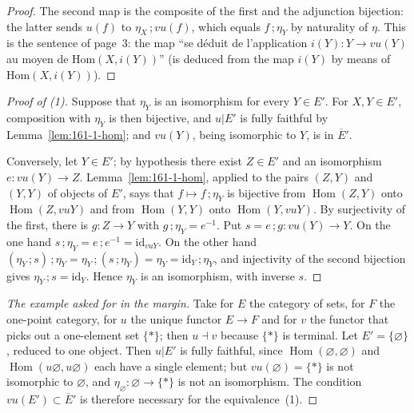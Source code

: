 \documentclass[11pt]{article}
\newcommand{\q}[1]{“#1”}
\theoremstyle{plain}
\theoremstyle{definition}
\theoremstyle{remark}
\begin{document}
\begin{proof}
The second map is the composite of the first and the adjunction bijection: the latter sends $u(f)$ to $\eta_X\,;vu(f)$, which equals $f\,;\eta_Y$ by naturality of $\eta$. This is the sentence of page~3: the map \q{se déduit de l'application $i(Y) : Y \to vu(Y)$ au moyen de $\mathrm{Hom}(X, i(Y))$} (is deduced from the map $i(Y)$ by means of $\mathrm{Hom}(X, i(Y))$).
\end{proof}

\begin{proof}[Proof of (1)]
Suppose that $\eta_Y$ is an isomorphism for every $Y \in E'$. For $X, Y \in E'$, composition with $\eta_Y$ is then bijective, and $u|E'$ is fully faithful by Lemma~\ref{lem:161-1-hom}; and $vu(Y)$, being isomorphic to $Y$, is in $\overline{E}'$.

Conversely, let $Y \in E'$; by hypothesis there exist $Z \in E'$ and an isomorphism $e : vu(Y) \to Z$. Lemma~\ref{lem:161-1-hom}, applied to the pairs $(Z, Y)$ and $(Y, Y)$ of objects of $E'$, says that $f \mapsto f\,;\eta_Y$ is bijective from $\operatorname{Hom}(Z, Y)$ onto $\operatorname{Hom}(Z, vuY)$ and from $\operatorname{Hom}(Y, Y)$ onto $\operatorname{Hom}(Y, vuY)$. By surjectivity of the first, there is $g : Z \to Y$ with $g\,;\eta_Y = e^{-1}$. Put $s = e\,;g : vu(Y) \to Y$. On the one hand $s\,;\eta_Y = e\,;e^{-1} = \mathrm{id}_{vuY}$. On the other hand $(\eta_Y\,;s)\,;\eta_Y = \eta_Y\,;(s\,;\eta_Y) = \eta_Y = \mathrm{id}_Y\,;\eta_Y$, and injectivity of the second bijection gives $\eta_Y\,;s = \mathrm{id}_Y$. Hence $\eta_Y$ is an isomorphism, with inverse $s$.
\end{proof}

\begin{proof}[The example asked for in the margin]
Take for $E$ the category of sets, for $F$ the one-point category, for $u$ the unique functor $E \to F$ and for $v$ the functor that picks out a one-element set $\{*\}$; then $u \dashv v$ because $\{*\}$ is terminal. Let $E' = \{\varnothing\}$, reduced to one object. Then $u|E'$ is fully faithful, since $\operatorname{Hom}(\varnothing, \varnothing)$ and $\operatorname{Hom}(u\varnothing, u\varnothing)$ each have a single element; but $vu(\varnothing) = \{*\}$ is not isomorphic to $\varnothing$, and $\eta_\varnothing : \varnothing \to \{*\}$ is not an isomorphism. The condition $vu(E') \subset \overline{E}'$ is therefore necessary for the equivalence~(1).
\end{proof}
\end{document}
